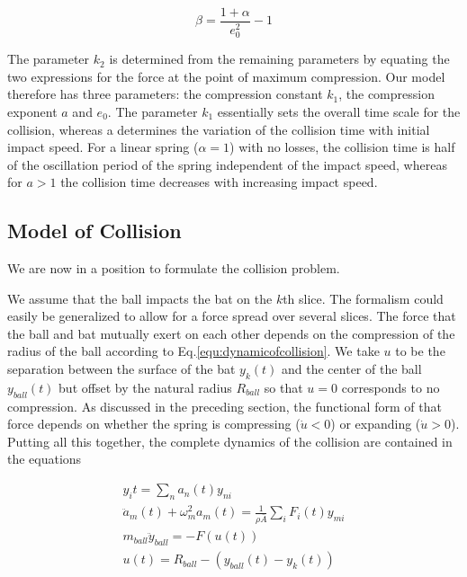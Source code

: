 \documentclass[12pt]{article}
\begin{document}
\begin{equation}
\beta=\frac{1+\alpha}{e_0^2}-1
\end{equation}

The parameter $k_2$ is determined from the remaining parameters by equating the two expressions for the force at the point of maximum compression. Our model therefore has three parameters: the compression constant $k_1$, the compression exponent $a$ and $e_0$.
The parameter $k_1$ essentially sets the overall time scale for the collision, whereas a determines
the variation of the collision time with initial impact speed. For a linear spring ($\alpha=1$) with no losses, the collision
time is half of the oscillation period of the spring independent of the impact speed, whereas for $a>1$ the collision
time decreases with increasing impact speed.

\subsection{Model of Collision}

We are now in a position to formulate the collision problem.

We assume that the ball impacts the bat on the $k$th slice.
The formalism could easily be generalized to allow for a force spread over several slices. The force that the ball and bat mutually exert on each other depends on
the compression of the radius of the ball according to
Eq.\ref{equ:dynamicofcollision}.
We take $u$ to be the separation between the surface of the bat $y_k(t)$ and the center of the ball $y_{ball}(t)$ but offset by the natural radius $R_{ball}$ so that $u=0$ corresponds to no compression.
As discussed in the preceding section, the functional
form of that force depends on whether the spring is compressing
($\dot{u}<0$) or expanding ($\dot{u}>0$). Putting all this together,
the complete dynamics of the collision are contained
in the equations

\begin{eqnarray}
y_i{t}=\sum_n a_n(t) y_{ni}\\
\ddot{a}_m(t)+\omega^2_m a_m(t)=\frac{1}{\rho \bar{A}}\sum_iF_i(t)y_{mi}\\ \label{equ:addot}
m_{ball}\ddot{y}_{ball}=-F(u(t))\\
u(t)=R_{ball}-(y_{ball}(t)-y_k(t))
\end{eqnarray}
\end{document}

